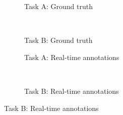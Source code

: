 \documentclass[preview]{standalone}
\begin{document}
\begin{minipage}{19.05cm}
\begin{figure}
	\centering
	\begin{subfigure}[t]{8.8cm}
	    \centering
	    \label{Fig2a}
	    \caption{Task A: Ground truth}
    \end{subfigure}
	~
	\begin{subfigure}[t]{8.8cm}
    	\centering
    	
    	\caption{Task B: Ground truth}
    	\label{Fig2b}
    \end{subfigure}

	\begin{subfigure}[t]{8.8cm}    
	    
    	\vspace{-0.5em}
    	\caption{Task A: Real-time annotations}
    	\label{Fig2c}
	\end{subfigure}
	~
    \begin{subfigure}[t]{8.8cm}
        
    	\vspace{-0.5em}
    	\caption{Task B: Real-time annotations}
    	\label{Fig2d}
	\end{subfigure}

\end{figure}
\end{minipage}
\end{document}
